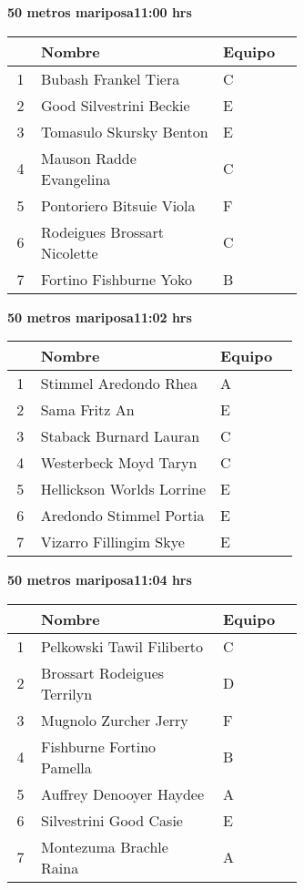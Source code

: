 \begin{minipage}{0.95\linewidth}
\begin{center}
\textbf{
50 metros mariposa\hspace{1cm}11:00 hrs}
\end{center}
\begin{tabular}{cp{0.63\linewidth}l}
\hline
& \textbf{Nombre} & \textbf{Equipo} \\ \hline
1 & Bubash Frankel Tiera & C \\ 
2 & Good Silvestrini Beckie & E \\ 
3 & Tomasulo Skursky Benton & E \\ 
4 & Mauson Radde Evangelina & C \\ 
5 & Pontoriero Bitsuie Viola & F \\ 
6 & Rodeigues Brossart Nicolette & C \\ 
7 & Fortino Fishburne Yoko & B \\ 
\end{tabular}
\end{minipage}
\begin{minipage}{0.95\linewidth}
\begin{center}
\textbf{
50 metros mariposa\hspace{1cm}11:02 hrs}
\end{center}
\begin{tabular}{cp{0.63\linewidth}l}
\hline
& \textbf{Nombre} & \textbf{Equipo} \\ \hline
1 & Stimmel Aredondo Rhea & A \\ 
2 & Sama Fritz An & E \\ 
3 & Staback Burnard Lauran & C \\ 
4 & Westerbeck Moyd Taryn & C \\ 
5 & Hellickson Worlds Lorrine & E \\ 
6 & Aredondo Stimmel Portia & E \\ 
7 & Vizarro Fillingim Skye & E \\ 
\end{tabular}
\end{minipage}
\begin{minipage}{0.95\linewidth}
\begin{center}
\textbf{
50 metros mariposa\hspace{1cm}11:04 hrs}
\end{center}
\begin{tabular}{cp{0.63\linewidth}l}
\hline
& \textbf{Nombre} & \textbf{Equipo} \\ \hline
1 & Pelkowski Tawil Filiberto & C \\ 
2 & Brossart Rodeigues Terrilyn & D \\ 
3 & Mugnolo Zurcher Jerry & F \\ 
4 & Fishburne Fortino Pamella & B \\ 
5 & Auffrey Denooyer Haydee & A \\ 
6 & Silvestrini Good Casie & E \\ 
7 & Montezuma Brachle Raina & A \\ 
\end{tabular}
\end{minipage}
